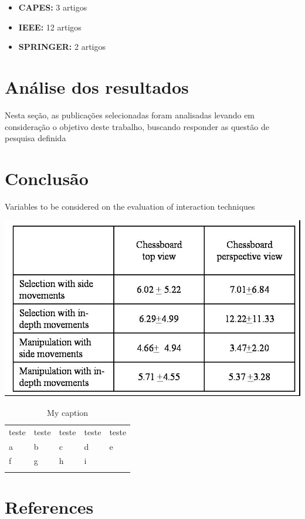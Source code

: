 \documentclass[12pt]{article}
\begin{document}
\begin{itemize}
  \item \textbf{CAPES:} 3 artigos
    \item \textbf{IEEE:} 12 artigos
    \item \textbf{SPRINGER:} 2 artigos
\end{itemize}

\section{Análise dos resultados} \label{sec5}

Nesta  seção,  as  publicações  selecionadas  foram  analisadas  levando  em  consideração  o
objetivo deste trabalho, buscando responder as questão de pesquisa definida


\section{Conclusão} \label{sec6}

\begin{table}[ht]
\centering
\caption{Variables to be considered on the evaluation of interaction
  techniques}
\label{tab:exTable1}
\includegraphics[width=.7\textwidth]{table.jpg}
\end{table}

\begin{table}[]
\centering
\caption{My caption}
\label{my-label}
\begin{tabular}{lllll}
teste & teste & teste & teste & teste \\
a     & b     & c     & d     & e     \\
f     & g     & h     & i     &       \\
      &       &       &       &
\end{tabular}
\end{table}

\section{References}


\end{document}
